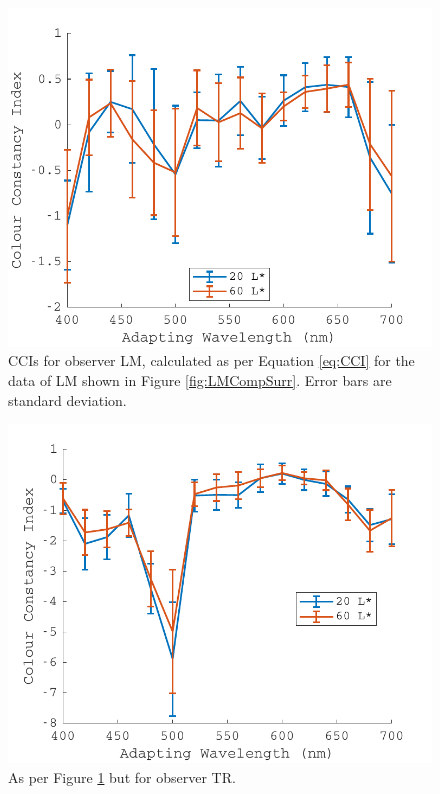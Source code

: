 \begin{figure}[htbp]
\includegraphics[max width=\textwidth]{figs/LargeSphere/LMCCI.pdf}
\caption{\Glspl{CCI} for observer LM, calculated as per Equation \ref{eq:CCI} for the data of LM shown in Figure \ref{fig:LMCompSurr}. Error bars are standard deviation.}
\label{fig:LMCCI}
\end{figure}

\begin{figure}[htbp]
\includegraphics[max width=\textwidth]{figs/LargeSphere/TRCCI.pdf}
\caption{As per Figure \ref{fig:LMCCI} but for observer TR.}
\label{fig:TRCCI}
\end{figure}

